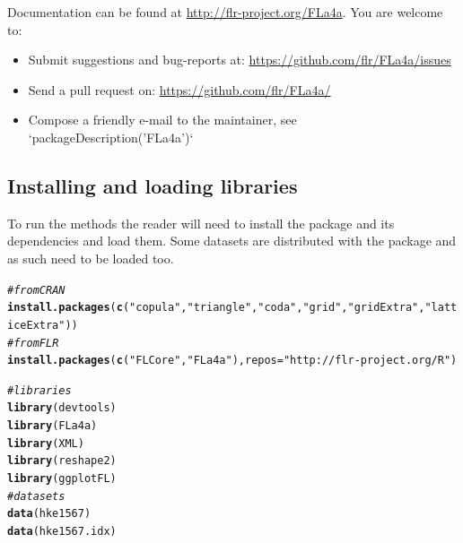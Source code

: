 \documentclass[a4paper,english,11pt]{article}\usepackage[]{graphicx}\usepackage[]{xcolor}
\makeatletter
\newcommand{\hlsng}[1]{\textcolor[rgb]{0.192,0.494,0.8}{#1}}%
\newcommand{\hlcom}[1]{\textcolor[rgb]{0.678,0.584,0.686}{\textit{#1}}}%
\newcommand{\hldef}[1]{\textcolor[rgb]{0.345,0.345,0.345}{#1}}%
\newcommand{\hlkwc}[1]{\textcolor[rgb]{0.333,0.667,0.333}{#1}}%
\newcommand{\hlkwd}[1]{\textcolor[rgb]{0.737,0.353,0.396}{\textbf{#1}}}%
\newenvironment{kframe}{%
 \def\at@end@of@kframe{}%
 \ifinner\ifhmode%
  \def\at@end@of@kframe{\end{minipage}}%
  \begin{minipage}{\columnwidth}%
 \fi\fi%
 \def\FrameCommand##1{\hskip\@totalleftmargin \hskip-\fboxsep
 \colorbox{shadecolor}{##1}\hskip-\fboxsep
     \hskip-\linewidth \hskip-\@totalleftmargin \hskip\columnwidth}%
 \MakeFramed {\advance\hsize-\width
   \@totalleftmargin\z@ \linewidth\hsize
   \@setminipage}}%
 {\par\unskip\endMakeFramed%
 \at@end@of@kframe}
\newenvironment{knitrout}{}{} %
\makeatother
\begin{document}
Documentation can be found at \url{http://flr-project.org/FLa4a}. You are welcome to:

\begin{itemize}
	\item Submit suggestions and bug-reports at: \url{https://github.com/flr/FLa4a/issues}
	\item Send a pull request on: \url{https://github.com/flr/FLa4a/}
	\item Compose a friendly e-mail to the maintainer, see `packageDescription('FLa4a')`
\end{itemize}

\subsection{Installing and loading libraries}

To run the  methods the reader will need to install the package and its dependencies and load them. Some datasets are distributed with the package and as such need to be loaded too.

\begin{knitrout}
\color{fgcolor}\begin{kframe}
\begin{alltt}
\hlcom{# from CRAN}
\hlkwd{install.packages}\hldef{(}\hlkwd{c}\hldef{(}\hlsng{"copula"}\hldef{,} \hlsng{"triangle"}\hldef{,} \hlsng{"coda"}\hldef{,} \hlsng{"grid"}\hldef{,} \hlsng{"gridExtra"}\hldef{,} \hlsng{"latticeExtra"}\hldef{))}
\hlcom{# from FLR}
\hlkwd{install.packages}\hldef{(}\hlkwd{c}\hldef{(}\hlsng{"FLCore"}\hldef{,} \hlsng{"FLa4a"}\hldef{),} \hlkwc{repos} \hldef{=} \hlsng{"http://flr-project.org/R"}\hldef{)}
\end{alltt}
\end{kframe}
\end{knitrout}

\begin{knitrout}
\color{fgcolor}\begin{kframe}
\begin{alltt}
\hlcom{# libraries}
\hlkwd{library}\hldef{(devtools)}
\hlkwd{library}\hldef{(FLa4a)}
\hlkwd{library}\hldef{(XML)}
\hlkwd{library}\hldef{(reshape2)}
\hlkwd{library}\hldef{(ggplotFL)}
\hlcom{# datasets}
\hlkwd{data}\hldef{(hke1567)}
\hlkwd{data}\hldef{(hke1567.idx)}
\end{alltt}
\end{kframe}
\end{knitrout}
\end{document}
